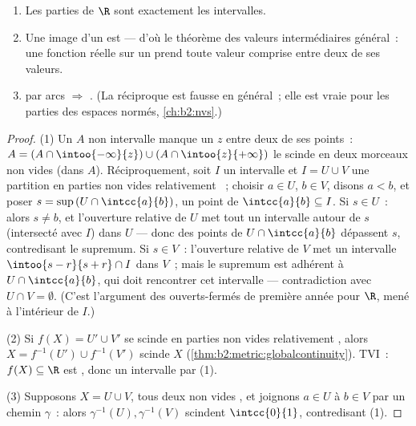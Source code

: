\begin{theorem}\label{thm:b2:metric:connectedness}
\begin{enumerate}
  \item Les parties  de $\R$ sont exactement les intervalles.
  \item Une image  d'un  est  --- d'où
        le théorème des valeurs intermédiaires général~: une fonction
        réelle  sur un  prend toute valeur
        comprise entre deux de ses valeurs.
  \item {} par arcs $\Rightarrow$ . (La réciproque est
        fausse en général~; elle est vraie pour les parties 
        des espaces normés, \cref{ch:b2:nvs}.)
\end{enumerate}
\end{theorem}

\begin{proof}
(1) Un $A$ non intervalle manque un $z$ entre deux de ses points~:
$A = (A \cap \intoo{-\infty}{z}) \cup (A \cap \intoo{z}{+\infty})$ le
scinde en deux morceaux non vides  (dans $A$). Réciproquement,
soit $I$ un intervalle et $I = U \cup V$ une partition en parties non
vides relativement ~; choisir $a \in U$, $b \in V$, disons $a
< b$, et poser $s = \sup\,(U \cap \intcc{a}{b})$, un point de
$\intcc{a}{b} \subseteq I$. Si $s \in U$~: alors $s \neq b$, et
l'ouverture relative de $U$ met tout un intervalle autour de $s$
(intersecté avec $I$) dans $U$ --- donc des points de $U \cap
\intcc{a}{b}$ dépassent $s$, contredisant le supremum. Si $s \in V$~:
l'ouverture relative de $V$ met un intervalle $\intoo{s - r}{s + r}
\cap I$ dans $V$~; mais le supremum est adhérent à $U \cap
\intcc{a}{b}$, qui doit rencontrer cet intervalle --- contradiction
avec $U \cap V = \emptyset$. (C'est l'argument des ouverts-fermés de
première année pour $\R$, mené à l'intérieur de $I$.)

(2) Si $f(X) = U' \cup V'$ se scinde en parties non vides relativement
, alors $X = f^{-1}(U') \cup f^{-1}(V')$ scinde $X$
(\cref{thm:b2:metric:globalcontinuity}). TVI~: $f(X) \subseteq \R$
est , donc un intervalle par (1).

(3) Supposons $X = U \cup V$, tous deux non vides , et joignons
$a \in U$ à $b \in V$ par un chemin $\gamma$~: alors $\gamma^{-1}(U),
\gamma^{-1}(V)$ scindent $\intcc{0}{1}$, contredisant (1).
\end{proof}


